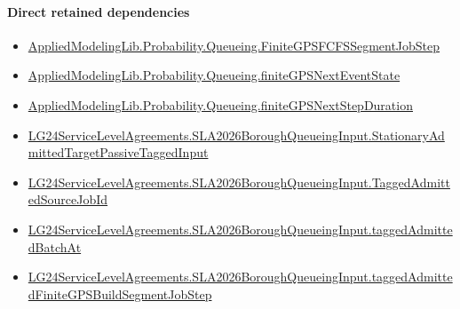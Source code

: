 \documentclass[10pt]{article}
\begin{document}
\paragraph{Direct retained dependencies}
\begin{itemize}\raggedright
\item \hyperlink{governing-declaration-8fcaf575fc5b34e1}{Applied\allowbreak{}Modeling\allowbreak{}Lib.\allowbreak{}Probability.\allowbreak{}Queueing.\allowbreak{}Finite\allowbreak{}GPSFCFS\allowbreak{}Segment\allowbreak{}Job\allowbreak{}Step}
\item \hyperlink{governing-declaration-257a24772abee1ca}{Applied\allowbreak{}Modeling\allowbreak{}Lib.\allowbreak{}Probability.\allowbreak{}Queueing.\allowbreak{}finite\allowbreak{}GPS\allowbreak{}Next\allowbreak{}Event\allowbreak{}State}
\item \hyperlink{governing-declaration-f290f0e19d616863}{Applied\allowbreak{}Modeling\allowbreak{}Lib.\allowbreak{}Probability.\allowbreak{}Queueing.\allowbreak{}finite\allowbreak{}GPS\allowbreak{}Next\allowbreak{}Step\allowbreak{}Duration}
\item \hyperlink{governing-declaration-8796a25a610eaea9}{LG24\allowbreak{}Service\allowbreak{}Level\allowbreak{}Agreements.\allowbreak{}SLA2026\allowbreak{}Borough\allowbreak{}Queueing\allowbreak{}Input.\allowbreak{}Stationary\allowbreak{}Admitted\allowbreak{}Target\allowbreak{}Passive\allowbreak{}Tagged\allowbreak{}Input}
\item \hyperlink{governing-declaration-03f187b908407c39}{LG24\allowbreak{}Service\allowbreak{}Level\allowbreak{}Agreements.\allowbreak{}SLA2026\allowbreak{}Borough\allowbreak{}Queueing\allowbreak{}Input.\allowbreak{}Tagged\allowbreak{}Admitted\allowbreak{}Source\allowbreak{}Job\allowbreak{}Id}
\item \hyperlink{governing-declaration-802a7f71e8b46c56}{LG24\allowbreak{}Service\allowbreak{}Level\allowbreak{}Agreements.\allowbreak{}SLA2026\allowbreak{}Borough\allowbreak{}Queueing\allowbreak{}Input.\allowbreak{}tagged\allowbreak{}Admitted\allowbreak{}Batch\allowbreak{}At}
\item \hyperlink{governing-declaration-cdba244b1da7c114}{LG24\allowbreak{}Service\allowbreak{}Level\allowbreak{}Agreements.\allowbreak{}SLA2026\allowbreak{}Borough\allowbreak{}Queueing\allowbreak{}Input.\allowbreak{}tagged\allowbreak{}Admitted\allowbreak{}Finite\allowbreak{}GPS\allowbreak{}Build\allowbreak{}Segment\allowbreak{}Job\allowbreak{}Step}
\end{itemize}
\hypertarget{governing-declaration-7f482cc00e1f2eb9}{}
\end{document}
